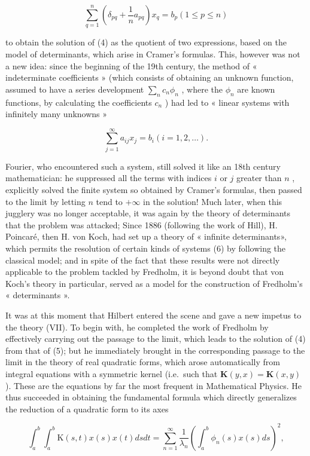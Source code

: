 \[
\sum_ {q = 1} ^ {n} \left(\delta_ {p q} + \frac {1}{n} a _ {p q}\right) x _ {q} = b _ {p} (1 \leqslant p \leqslant n)\tag{5}
\]

to obtain the solution of (4) as the quotient of two expressions, based on the model of determinants, which arise in Cramer's formulas. This, however was not a new idea: since the beginning of the 19th century, the method of « indeterminate coefficients » (which consists of obtaining an unknown function, assumed to have a series development \(\sum_{n} c_{n} \phi_{n}\) , where the \(\phi_{n}\) are known functions, by calculating the coefficients \(c_{n}\) ) had led to « linear systems with infinitely many unknowns »

\[
\sum_ {j = 1} ^ {\infty} a _ {i j} x _ {j} = b _ {i} (i = 1, 2, \dots).\tag{6}
\]

Fourier, who encountered such a system, still solved it like an 18th century mathematician: he suppressed all the terms with indices \(i\) or \(j\) greater than \(n\) , explicitly solved the finite system so obtained by Cramer's formulas, then passed to the limit by letting \(n\) tend to \(+\infty\) in the solution! Much later, when this jugglery was no longer acceptable, it was again by the theory of determinants that the problem was attacked; Since 1886 (following the work of Hill), H. Poincaré, then H. von Koch, had set up a theory of « infinite determinants», which permits the resolution of certain kinds of systems (6) by following the classical model; and in spite of the fact that these results were not directly applicable to the problem tackled by Fredholm, it is beyond doubt that von Koch's theory in particular, served as a model for the construction of Fredholm's « determinants ».

It was at this moment that Hilbert entered the scene and gave a new impetus to the theory (VII). To begin with, he completed the work of Fredholm by effectively carrying out the passage to the limit, which leads to the solution of (4) from that of (5); but he immediately brought in the corresponding passage to the limit in the theory of real quadratic forms, which arose automatically from integral equations with a symmetric kernel (i.e.~such that \(\mathbf{K}(y,x)=\mathbf{K}(x,y)\) ). These are the equations by far the most frequent in Mathematical Physics. He thus succeeded in obtaining the fundamental formula which directly generalizes the reduction of a quadratic form to its axes

\[
\int_ {a} ^ {b} \int_ {a} ^ {b} \mathrm{K} (s, t) x (s) x (t) d s d t = \sum_ {n = 1} ^ {\infty} \frac {1}{\lambda_ {n}} \left(\int_ {a} ^ {b} \phi_ {n} (s) x (s) d s\right) ^ {2},\tag{7}
\]

